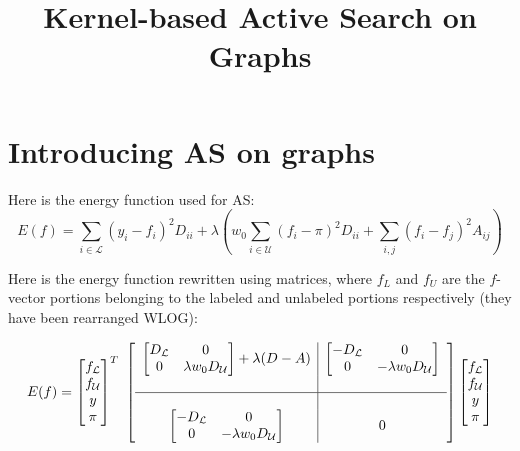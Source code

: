 \documentclass[12pt]{article}
\title{Kernel-based Active Search on Graphs}
\date{\vspace{-10ex}}
\renewcommand{\L}{\mathcal{L}}
\newcommand{\U}{\mathcal{U}}
\begin{document}
	\maketitle

	\section{Introducing AS on graphs}

		Here is the energy function used for AS:
		\begin{equation}
			E(f) = \sum\limits_{i \in \L} (y_i-f_i)^2 D_{ii} + \lambda \left(w_0 \sum\limits_{i \in \U} (f_i-\pi)^2 D_{ii} + \sum\limits_{i,j} (f_i-f_j)^2 A_{ij}\right)
		\end{equation}

		Here is the energy function rewritten using matrices, where $f_L$ and $f_U$ are the $f$-vector portions belonging to the labeled and unlabeled portions respectively (they have been rearranged WLOG):

		$$E(f) = \left[\begin{matrix} f_\L \\ f_\U \\ y \\ \pi \end{matrix}\right]^T \
				 \left[\begin{array}{c|c}
				 	\left[\begin{matrix} D_\L & 0 \\ 0&\lambda w_0 D_\U\end{matrix}\right] + \lambda(D-A) & 
				 	\left[\begin{matrix} -D_\L & 0 \\ 0&-\lambda w_0 D_\U\end{matrix}\right] 
				 	\\\\ \hline \\ 
				 	\left[\begin{matrix} -D_\L & 0 \\ 0&-\lambda w_0 D_\U\end{matrix}\right] & 
				 	0
				 	\end{array}\right] 
				 \left[\begin{matrix} f_\L \\ f_\U \\ y \\ \pi \end{matrix}\right]
		$$
\end{document}

